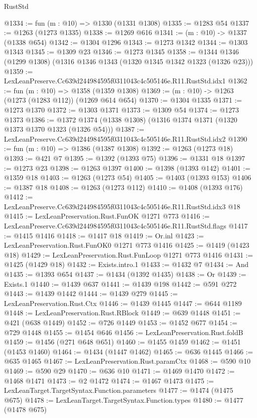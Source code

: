 \begin{lexlean}{RustStd}
\begin{coremodule}
@1334 := fun (m : @10) => @1330 (@1331 @1308)
@1335 := @1283 @54
@1337 := @1263 (@1273 @1335)
@1338 := @1269 @616
@1341 := (m : @10) -> @1337 (@1338 @654)
@1342 := @1304 @1296
@1343 := @1273 @1342
@1344 := @1303 @1343
@1345 := @1309 @23
@1346 := @1273 @1345
@1358 := @1344 @1346 (@1299 @1308) (@1316 @1346 @1343 (@1320 @1345 @1342 @1323 (@1326 @23)))
@1359 := LexLeanPreserve.Cc639d244984595f0311043c4c505146e.R11.RustStd.idx1
@1362 := fun (m : @10) => @1358 (@1359 @1308)
@1369 := (m : @10) -> @1263 (@1273 (@1283 @112)) (@1269 @614 @654)
@1370 := @1304 @1335
@1371 := @1273 @1370
@1372 := @1303 @1371
@1373 := @1309 @54
@1374 := @1273 @1373
@1386 := @1372 @1374 (@1338 @1308) (@1316 @1374 @1371 (@1320 @1373 @1370 @1323 (@1326 @54)))
@1387 := LexLeanPreserve.Cc639d244984595f0311043c4c505146e.R11.RustStd.idx2
@1390 := fun (m : @10) => @1386 (@1387 @1308)
@1392 := @1263 (@1273 @18)
@1393 := @421 @7
@1395 := @1392 (@1393 @75)
@1396 := @1331 @18
@1397 := @1273 @23
@1398 := @1263 @1397
@1400 := @1398 (@1393 @142)
@1401 := @1359 @18
@1403 := @1263 (@1273 @54)
@1405 := @1403 (@1393 @153)
@1406 := @1387 @18
@1408 := @1263 (@1273 @112)
@1410 := @1408 (@1393 @176)
@1412 := LexLeanPreserve.Cc639d244984595f0311043c4c505146e.R11.RustStd.idx3 @18
@1415 := LexLeanPreservation.Rust.FunOK @1271 @773
@1416 := LexLeanPreserve.Cc639d244984595f0311043c4c505146e.R11.RustStd.flags
@1417 := @1415 @1416
@1418 := @1417 @18
@1419 := Or.inl
@1423 := LexLeanPreservation.Rust.FunOK0 @1271 @773 @1416
@1425 := @1419 (@1423 @18)
@1429 := LexLeanPreservation.Rust.FunLoop @1271 @773 @1416
@1431 := @1425 (@1429 @18)
@1432 := Exists.intro.{1}
@1433 := @1432 @7
@1434 := And
@1435 := @1393 @654
@1437 := @1434 (@1392 @1435)
@1438 := Or
@1439 := Exists.{1}
@1440 := @1439 @637
@1441 := @1439 @198
@1442 := @591 @272
@1443 := @1439 @1442
@1444 := @1439 @279
@1445 := LexLeanPreservation.Rust.Ctx
@1446 := @1439 @1445
@1447 := @644 @1189
@1448 := LexLeanPreservation.Rust.RBlock
@1449 := @639 @1448
@1451 := @421 (@638 @1449)
@1452 := @726 @1449
@1453 := @1452 @677
@1454 := @729 @1448
@1455 := @1454 @646
@1456 := LexLeanPreservation.Rust.foldB
@1459 := @1456 (@271 @648 @651)
@1460 := @1455 @1459
@1462 := @1451 (@1453 @1460)
@1464 := @1434 (@1447 @1462)
@1465 := @636 @1445
@1466 := @635 @1465
@1467 := LexLeanPreservation.Rust.paramCtx
@1468 := @590 @10
@1469 := @590 @29
@1470 := @636 @10
@1471 := @1469 @1470
@1472 := @1468 @1471
@1473 := @2 @1472
@1474 := @1467 @1473
@1475 := LexLeanTarget.TargetSyntax.Function.parameters
@1477 := @1474 (@1475 @675)
@1478 := LexLeanTarget.TargetSyntax.Function.types
@1480 := @1477 (@1478 @675)

\end{coremodule}
\end{lexlean}
